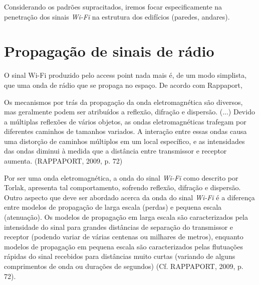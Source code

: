 \documentclass[
	12pt,				%
	openright,			%
	twoside,			%
	a4paper,			%
	english,			%
	french,				%
	spanish,			%
	brazil				%
	]{abntex2}
\begin{document}
Considerando os padrões supracitados, iremos focar especificamente na penetração dos sinais \textit{Wi-Fi} na estrutura dos edifícios (paredes, andares).

\section[Propagação de sinais de rádio]{Propagação de sinais de rádio}

O sinal Wi-Fi produzido pelo access point nada mais é, de um modo simplista, que uma onda de rádio que se propaga no espaço. De acordo com Rappaport,

\begin{citacao}
	Os mecanismos por trás da propagação da onda eletromagnética são diversos, mas geralmente podem ser atribuídos a reflexão, difração e dispersão. (...) Devido a múltiplas reflexões de vários objetos, as ondas eletromagnéticas trafegam por diferentes caminhos de tamanhos variados. A interação entre essas ondas causa uma distorção de caminhos múltiplos em um local específico, e as intensidades das ondas diminui à medida que a distância entre transmissor e receptor aumenta. (RAPPAPORT, 2009, p. 72)
	
\end{citacao}

Por ser uma onda eletromagnética, a onda do sinal \textit{Wi-Fi} como descrito por Torlak, apresenta tal comportamento, sofrendo reflexão, difração e dispersão. Outro aspecto que deve ser abordado acerca da onda do sinal \textit{Wi-Fi} é a diferença entre modelos de propagação de larga escala (perdas) e pequena escala (atenuação). Os modelos de propagação em larga escala são caracterizados pela intensidade do sinal para grandes distâncias de separação do transmissor e receptor (podendo variar de várias centenas ou milhares de metros), enquanto modelos de propagação em pequena escala são caracterizados pelas flutuações rápidas do sinal recebidos para distâncias muito curtas (variando de alguns comprimentos de onda ou durações de segundos) (Cf. RAPPAPORT, 2009, p. 72).
\end{document}
